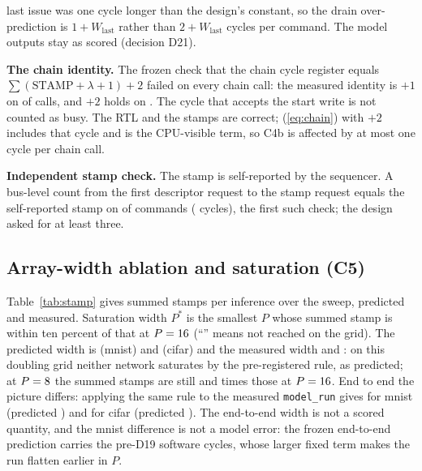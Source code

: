\documentclass[journal]{IEEEtran}
\begin{document}
last issue was one cycle longer than the design's constant, so the drain over-prediction is $1+W_{\mathrm{last}}$ rather than $2+W_{\mathrm{last}}$ cycles per command. The model outputs stay as scored (decision D21).

\begin{table}[t]\centering\caption{Commands whose error exceeds the pre-registered bias (cycles; error and registered bias in \%).}\label{tab:exceed}
\footnotesize
\end{table}

\textbf{The chain identity.} The frozen check that the chain cycle register equals $\sum(\mathrm{STAMP}+\lambda+1)+2$ failed on every chain call: the measured identity is $+1$ on \IdentPlusOne{} of \IdentCalls{} calls, and $+2$ holds on \IdentPlusTwo. The cycle that accepts the start write is not counted as busy. The RTL and the stamps are correct; (\ref{eq:chain}) with $+2$ includes that cycle and is the CPU-visible term, so C4b is affected by at most one cycle per chain call.

\textbf{Independent stamp check.} The stamp is self-reported by the sequencer. A bus-level count from the first descriptor request to the stamp request equals the self-reported stamp on \IndepStampAgree{} of \IndepStampN{} commands (\IndepStampList{} cycles), the first such check; the design asked for at least three.

\subsection{Array-width ablation and saturation (C5)}\label{sec:results-c5}
Table~\ref{tab:stamp} gives summed stamps per inference over the sweep, predicted and measured. Saturation width $P^\ast$ is the smallest $P$ whose summed stamp is within ten percent of that at $P=16$ (``\PMax'' means not reached on the grid). The predicted width is \PredPstarMnist{} (mnist) and \PredPstarCifar{} (cifar) and the measured width \PstarMeasMnist{} and \PstarMeasCifar: on this doubling grid neither network saturates by the pre-registered rule, as predicted; at $P=8$ the summed stamps are still \MeasStampRatioMnist{} and \MeasStampRatioCifar{} times those at $P=16$. End to end the picture differs: applying the same rule to the measured \texttt{model\_run} gives \PstarEndMeasMnist{} for mnist (predicted \PredPstarEndMnist) and \PstarEndMeasCifar{} for cifar (predicted \PredPstarEndCifar). The end-to-end width is not a scored quantity, and the mnist difference is not a model error: the frozen end-to-end prediction carries the pre-D19 software cycles, whose larger fixed term makes the run flatten earlier in $P$.
\end{document}
